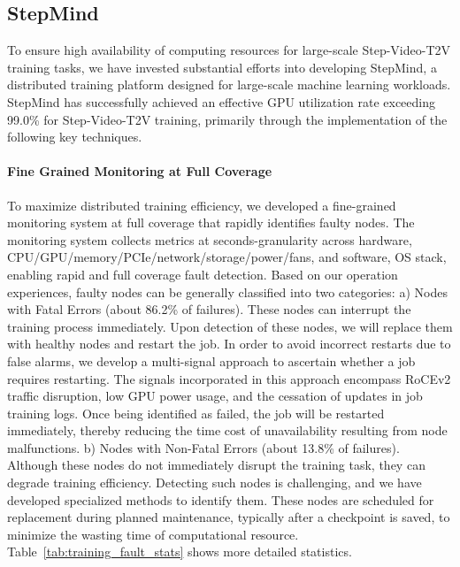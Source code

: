 \subsection{StepMind}
\label{subsec:system_platform}
To ensure high availability of computing resources for large-scale Step-Video-T2V training tasks, we have invested substantial efforts into developing StepMind, a distributed training platform designed for large-scale machine learning workloads. StepMind has successfully achieved an effective GPU utilization rate exceeding 99.0\% for Step-Video-T2V training, primarily through the implementation of the following key techniques. 


\paragraph{Fine Grained Monitoring at Full Coverage}
To maximize distributed training efficiency, we developed a fine-grained monitoring system at full coverage that rapidly identifies faulty nodes. The monitoring system collects metrics at seconds-granularity across hardware, \eg CPU/GPU/memory/PCIe/network/storage/power/fans, and software, \eg OS stack, enabling rapid and full coverage fault detection. 
Based on our operation experiences, faulty nodes can be generally classified into two categories: 
a) Nodes with Fatal Errors (about 86.2\% of failures). 
These nodes can interrupt the training process immediately. Upon detection of these nodes, we will replace them with healthy nodes and restart the job.
In order to avoid incorrect restarts due to false alarms, we develop a multi-signal approach to ascertain whether a job requires restarting. The signals incorporated in this approach encompass RoCEv2 traffic disruption, low GPU power usage, and the cessation of updates in job training logs.
Once being identified as failed, the job will be restarted immediately, thereby reducing the time cost of unavailability resulting from node malfunctions.
b) Nodes with Non-Fatal Errors (about 13.8\% of failures).
Although these nodes do not immediately disrupt the training task, they can degrade training efficiency. Detecting such nodes is challenging, and we have developed specialized methods to identify them. These nodes are scheduled for replacement during planned maintenance, typically after a checkpoint is saved, to minimize the wasting time of computational resource.
Table~\ref{tab:training_fault_stats} shows more detailed statistics.




